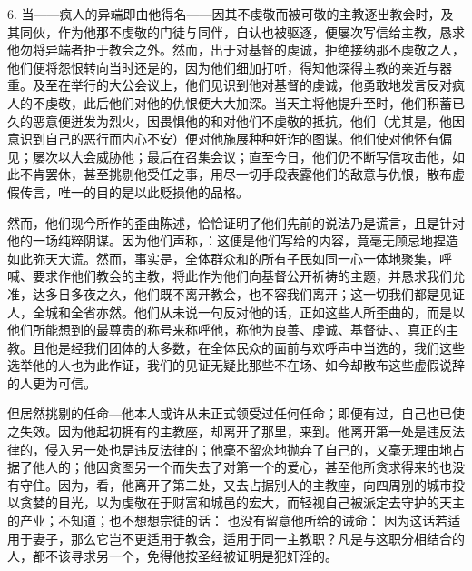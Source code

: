 6. 当——疯人的异端即由他得名——因其不虔敬而被可敬的主教逐出教会时，及其同伙，作为他那不虔敬的门徒与同伴，自认也被驱逐，便屡次写信给主教，恳求他勿将异端者拒于教会之外。然而，出于对基督的虔诚，拒绝接纳那不虔敬之人，他们便将怨恨转向当时还是的，因为他们细加打听，得知他深得主教的亲近与器重。及至在举行的大公会议上，他们见识到他对基督的虔诚，他勇敢地发言反对疯人的不虔敬，此后他们对他的仇恨便大大加深。当天主将他提升至时，他们积蓄已久的恶意便迸发为烈火，因畏惧他的和对他们不虔敬的抵抗，他们（尤其是，他因意识到自己的恶行而内心不安）便对他施展种种奸诈的图谋。他们使对他怀有偏见；屡次以大会威胁他；最后在召集会议；直至今日，他们仍不断写信攻击他，如此不肯罢休，甚至挑剔他受任之事，用尽一切手段表露他们的敌意与仇恨，散布虚假传言，唯一的目的是以此贬损他的品格。\par

然而，他们现今所作的歪曲陈述，恰恰证明了他们先前的说法乃是谎言，且是针对他的一场纯粹阴谋。因为他们声称，：这便是他们写给的内容，竟毫无顾忌地捏造如此弥天大谎。然而，事实是，全体群众和的所有子民如同一心一体地聚集，呼喊、要求作他们教会的主教，将此作为他们向基督公开祈祷的主题，并恳求我们允准，达多日多夜之久，他们既不离开教会，也不容我们离开；这一切我们都是见证人，全城和全省亦然。他们从未说一句反对他的话，正如这些人所歪曲的，而是以他们所能想到的最尊贵的称号来称呼他，称他为良善、虔诚、基督徒、、真正的主教。且他是经我们团体的大多数，在全体民众的面前与欢呼声中当选的，我们这些选举他的人也为此作证，我们的见证无疑比那些不在场、如今却散布这些虚假说辞的人更为可信。\par

但居然挑剔的任命---他本人或许从未正式领受过任何任命；即便有过，自己也已使之失效。因为他起初拥有的主教座，却离开了那里，来到。他离开第一处是违反法律的，侵入另一处也是违反法律的；他毫不留恋地抛弃了自己的，又毫无理由地占据了他人的；他因贪图另一个而失去了对第一个的爱心，甚至他所贪求得来的也没有守住。因为，看，他离开了第二处，又去占据别人的主教座，向四周别的城市投以贪婪的目光，以为虔敬在于财富和城邑的宏大，而轻视自己被派定去守护的天主的产业；不知道；也不想想宗徒的话： 也没有留意他所给的诫命： 因为这话若适用于妻子，那么它岂不更适用于教会，适用于同一主教职？凡是与这职分相结合的人，都不该寻求另一个，免得他按圣经被证明是犯奸淫的。\par

